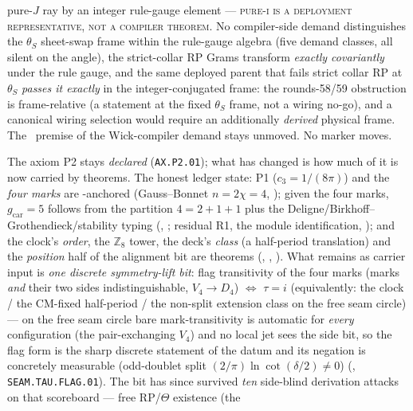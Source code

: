 \documentclass[11pt,a4paper]{article}
\newcommand{\gcar}{g_{\mathrm{car}}}
\newcommand{\cthree}{c_3}
\newcommand{\Z}{\mathbb{Z}}
\theoremstyle{definition}
\begin{document}
\begin{keybox}
pure-$J$ ray by an integer rule-gauge element --- \textsc{pure-i
is a deployment representative, not a compiler theorem}.  No
compiler-side demand distinguishes the $\theta_S$ sheet-swap
frame within the rule-gauge algebra (five demand classes, all
silent on the angle), the strict-collar RP Grams transform
\emph{exactly covariantly} under the rule gauge, and the same
deployed parent that fails strict collar RP at $\theta_S$
\emph{passes it exactly} in the integer-conjugated frame: the
rounds-58/59 obstruction is frame-relative (a statement at the
fixed $\theta_S$ frame, not a wiring no-go), and a canonical
wiring selection would require an additionally \emph{derived}
physical frame.  The \mO\ premise of the Wick-compiler demand
stays unmoved.  No marker moves.
\end{keybox}

\begin{keybox}
The axiom P2 stays \emph{declared} (\texttt{AX.P2.01}); what has changed is how much of it is now
carried by theorems. The honest ledger state: P1 ($\cthree=1/(8\pi)$) and the \emph{four marks} are
\mE-anchored (Gauss--Bonnet $n=2\chi=4$, ); given the four marks,
$\gcar=5$ follows from the partition $4=2{+}1{+}1$ plus the Deligne/Birkhoff--Grothendieck/stability
typing (, ; residual
R1, the module identification, \mC); and the clock's \emph{order}, the $\Z_8$ tower, the deck's
\emph{class} (a half-period translation) and the \emph{position} half of the alignment bit are
theorems (, ,
). What remains as carrier input is \emph{one discrete
symmetry-lift bit}: flag transitivity of the four marks (marks \emph{and} their two sides
indistinguishable, $V_4\to D_4$) $\iff$ $\tau=i$ (equivalently: the clock / the CM-fixed
half-period / the non-split extension class on the free seam circle) --- on the free seam circle
bare mark-transitivity is automatic for \emph{every} configuration (the pair-exchanging $V_4$) and
no local jet sees the side bit, so the flag form is the sharp discrete statement of the datum and
its negation is concretely measurable (odd-doublet split $(2/\pi)\ln\cot(\delta/2)\neq0$)
(, \texttt{SEAM.TAU.FLAG.01}). The bit has since survived
\emph{ten} side-blind derivation attacks on that scoreboard --- free RP/$\Theta$ existence (the

\end{keybox}
\end{document}
